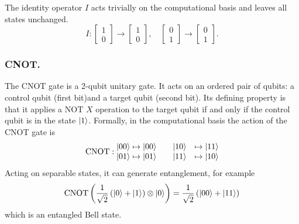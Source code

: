 \documentclass[../../../main.tex]{subfiles}
\begin{document}
The identity operator \(I\) acts trivially on the computational basis and leaves all states unchanged.
\begin{equation*}
  I : \begin{bmatrix} 1 \\ 0 \end{bmatrix} \rightarrow \begin{bmatrix} 1 \\ 0 \end{bmatrix},
  \quad
  \begin{bmatrix} 0 \\ 1 \end{bmatrix} \rightarrow \begin{bmatrix} 0 \\ 1 \end{bmatrix}.
\end{equation*}

\subsubsection{CNOT.}
The $\mathrm{CNOT}$ gate is a 2-qubit unitary gate.
It acts on an ordered pair of qubits: a control qubit (first bit)and a target qubit (second bit).
Its defining property is that it applies a $\mathrm{NOT}$ $X$ operation to the target qubit if and only if the control qubit is in the state $\ket{1}$.
Formally, in the computational basis  the action of the CNOT gate is
\begin{align*}
  \mathrm{CNOT}:
  \begin{matrix}
    \ket{00} \mapsto \ket{00} \\
    \ket{01} \mapsto \ket{01}
  \end{matrix}
  \qquad
  \begin{matrix}
    \ket{10} & \mapsto \ket{11} \\
    \ket{11} & \mapsto \ket{10}
  \end{matrix}
\end{align*}
Acting on separable states, it can generate entanglement, for example
\begin{equation*}
  \mathrm{CNOT}\left(\frac{1}{\sqrt{2}}\left(\ket{0} + \ket{1}\right) \otimes \ket{0}\right) =\frac{1}{\sqrt{2}}\left(|00\rangle + |11\rangle\right)
\end{equation*}
which is an entangled Bell state.
\end{document}
